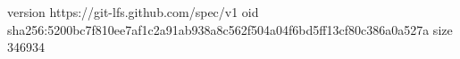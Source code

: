 version https://git-lfs.github.com/spec/v1
oid sha256:5200bc7f810ee7af1c2a91ab938a8c562f504a04f6bd5ff13cf80c386a0a527a
size 346934
